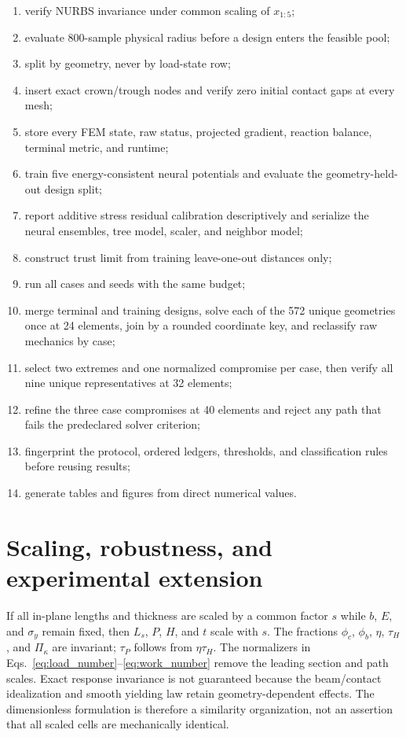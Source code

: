 \documentclass[11pt]{article}
\newcommand{\phib}{\phi_{b}}
\newcommand{\phic}{\phi_{c}}
\begin{document}
\begin{enumerate}[leftmargin=*,itemsep=2pt]
\item verify NURBS invariance under common scaling of $x_{1:5}$;
\item evaluate 800-sample physical radius before a design enters the feasible pool;
\item split by geometry, never by load-state row;
\item insert exact crown/trough nodes and verify zero initial contact gaps at every mesh;
\item store every FEM state, raw status, projected gradient, reaction balance, terminal metric, and runtime;
\item train five energy-consistent neural potentials and evaluate the geometry-held-out design split;
\item report additive stress residual calibration descriptively and serialize the neural ensembles, tree model, scaler, and neighbor model;
\item construct trust limit from training leave-one-out distances only;
\item run all cases and seeds with the same budget;
\item merge terminal and training designs, solve each of the 572 unique geometries once at 24 elements, join by a rounded coordinate key, and reclassify raw mechanics by case;
\item select two extremes and one normalized compromise per case, then verify all nine unique representatives at 32 elements;
\item refine the three case compromises at 40 elements and reject any path that fails the predeclared solver criterion;
\item fingerprint the protocol, ordered ledgers, thresholds, and classification rules before reusing results;
\item generate tables and figures from direct numerical values.
\end{enumerate}

\section{Scaling, robustness, and experimental extension}

If all in-plane lengths and thickness are scaled by a common factor $s$ while $b$, $E$, and $\sigma_y$ remain fixed, then $L_s$, $P$, $H$, and $t$ scale with $s$. The fractions $\phic$, $\phib$, $\eta$, $\tau_H$, and $\Pi_\kappa$ are invariant; $\tau_P$ follows from $\eta\tau_H$. The normalizers in Eqs.~\eqref{eq:load_number}--\eqref{eq:work_number} remove the leading section and path scales. Exact response invariance is not guaranteed because the beam/contact idealization and smooth yielding law retain geometry-dependent effects. The dimensionless formulation is therefore a similarity organization, not an assertion that all scaled cells are mechanically identical.
\end{document}
